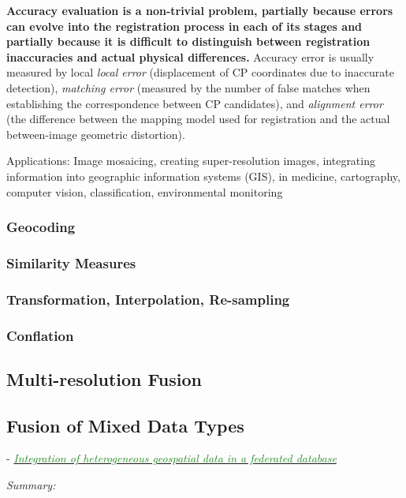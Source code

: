 \documentclass[]{article}
\newcommand{\paperentry}[4]{
            \hangindent=1cm
            \cite{#1} - \href{run:../References/#3}{\textcolor{ForestGreen}{\textit{#2}}}
            
            \noindent            
            \begin{minipage}[t]{0.1\linewidth}\hfill\end{minipage}
            \begin{minipage}[t]{0.8\linewidth}\textcolor{NavyBlue}{{\textit{Summary:}}}#4\end{minipage}
            \vspace{.25cm}
          }
\begin{document}
		\noindent
		\textbf{Accuracy evaluation is a non-trivial problem, partially because errors can evolve into the registration process in each of its stages and partially because it is difficult to distinguish between registration inaccuracies and actual physical differences.}  Accuracy error is usually measured by local \textit{local error} (displacement of CP coordinates due to inaccurate detection), \textit{matching error} (measured by the number of false matches when establishing the correspondence between CP candidates), and \textit{alignment error} (the difference between the mapping model used for registration and the actual between-image geometric distortion).
		
		\noindent
		Applications: Image mosaicing, creating super-resolution images, integrating information into geographic information systems (GIS), in medicine, cartography, computer vision, classification, environmental monitoring \\
		
	
		\subsubsection{Geocoding}
	
		\subsubsection{Similarity Measures}
	
		\subsubsection{Transformation, Interpolation, Re-sampling}
	
		\subsubsection{Conflation}
		
	\subsection{Multi-resolution Fusion}
	
	\subsection{Fusion of Mixed Data Types}
		
		\paperentry{Butenuth2007HeterogeneousGeospatialData}
		{Integration of heterogeneous geospatial data in a federated database}
		{Fusion/Butenuth2007HeterogeneousGeospatialData.pdf}
		{}
		
\end{document}

